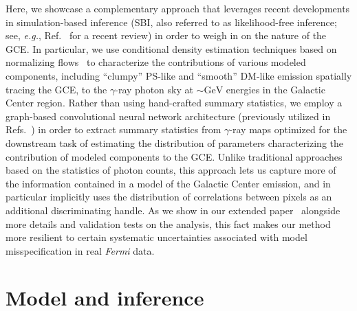 \documentclass[]{article}
\newcommand{\Fermi}{\emph{Fermi}\xspace}
\begin{document}
Here, we showcase a complementary approach that leverages recent developments in simulation-based inference (SBI, also referred to as likelihood-free inference; see, \emph{e.g.}, Ref.~\cite{cranmer2020frontier} for a recent review)
in order to weigh in on the nature of the GCE. In particular, we use conditional density estimation techniques based on normalizing flows~\cite{papamakarios2019normalizing,rezende2015variational} to characterize the contributions of various modeled components, including ``clumpy'' PS-like and ``smooth'' DM-like emission spatially tracing the GCE, to the $\gamma$-ray photon sky at $\sim\mathrm{GeV}$ energies in the Galactic Center region. Rather than using hand-crafted summary statistics, we employ a graph-based convolutional neural network architecture (previously utilized in Refs.~\cite{List:2020mzd,List:2021aer}) in order to extract summary statistics from $\gamma$-ray maps optimized for the downstream task of estimating the distribution of parameters characterizing the contribution of modeled components to the GCE. Unlike traditional approaches based on the statistics of photon counts, this approach lets us capture more of the information contained in a model of the Galactic Center emission, and in particular implicitly uses the distribution of correlations between pixels as an additional discriminating handle. As we show in our extended paper~\cite{Mishra-Sharma:InProgress} alongside more details and validation tests on the analysis, this fact makes our method more resilient to certain systematic uncertainties associated with model misspecification in real \Fermi data.

\section{Model and inference}
\label{sec:model}
\end{document}
